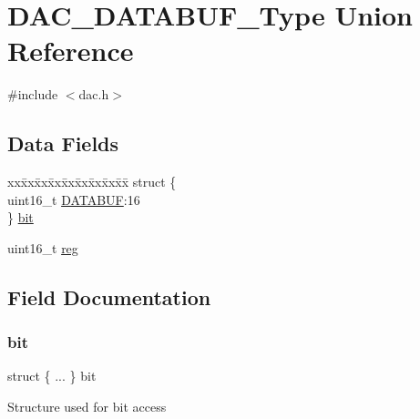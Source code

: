 \hypertarget{union_d_a_c___d_a_t_a_b_u_f___type}{}\section{D\+A\+C\+\_\+\+D\+A\+T\+A\+B\+U\+F\+\_\+\+Type Union Reference}
\label{union_d_a_c___d_a_t_a_b_u_f___type}


{\ttfamily \#include $<$dac.\+h$>$}

\subsection*{Data Fields}
\begin{DoxyCompactItemize}
\item 
\begin{tabbing}
xx\=xx\=xx\=xx\=xx\=xx\=xx\=xx\=xx\=\kill
struct \{\\
\>uint16\_t \mbox{\hyperlink{union_d_a_c___d_a_t_a_b_u_f___type_ac652664ec3bf72672ec0ee9d4ad5cac7}{DATABUF}}:16\\
\} \mbox{\hyperlink{union_d_a_c___d_a_t_a_b_u_f___type_a6116271af235f06ea6abbdb598879d30}{bit}}\\

\end{tabbing}\item 
uint16\+\_\+t \mbox{\hyperlink{union_d_a_c___d_a_t_a_b_u_f___type_a11760f5020019f4aa8cb02e694f7cc44}{reg}}
\end{DoxyCompactItemize}


\subsection{Field Documentation}
\mbox{\label{union_d_a_c___d_a_t_a_b_u_f___type_a6116271af235f06ea6abbdb598879d30}} 
\subsubsection{\texorpdfstring{bit}{bit}}
{\footnotesize\ttfamily struct \{ ... \}   bit}

Structure used for bit access \mbox{\label{union_d_a_c___d_a_t_a_b_u_f___type_ac652664ec3bf72672ec0ee9d4ad5cac7}} 
